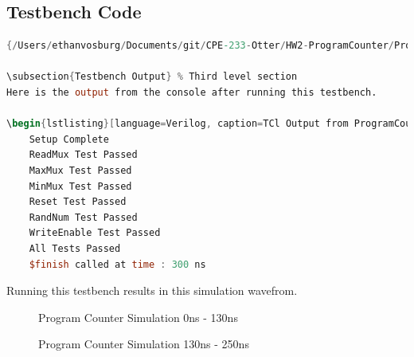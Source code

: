 \documentclass[
    a4paper, %
	12pt, %
    ]{CSSullivanBusinessReport}
\begin{document}
\begin{fullwidth}
\subsection{Testbench Code} %

\begin{lstlisting}[language=Verilog, caption=Verilog Testbench for Program Counter]{/Users/ethanvosburg/Documents/git/CPE-233-Otter/HW2-ProgramCounter/ProgramCounter/ProgramCounter.srcs/sim_1/new/ProgramCounterEnv_TB.sv}

\subsection{Testbench Output} % Third level section
Here is the output from the console after running this testbench.

\begin{lstlisting}[language=Verilog, caption=TCl Output from ProgramCounterEnv\_TB]
    Setup Complete
    ReadMux Test Passed
    MaxMux Test Passed
    MinMux Test Passed
    Reset Test Passed
    RandNum Test Passed
    WriteEnable Test Passed
    All Tests Passed
    $finish called at time : 300 ns
\end{lstlisting}

Running this testbench results in this simulation wavefrom.

\begin{figure}[H]
    \centering
    \captionsetup{style=widetable}
    \caption{Program Counter Simulation 0ns - 130ns}
    \label{fig:PCSimulation}
\end{figure}

\begin{figure}[H]
    \centering
    \captionsetup{style=widetable}
    \caption{Program Counter Simulation 130ns - 250ns}
    \label{fig:PCSimulation}
\end{figure}


\end{fullwidth}
\end{document}
